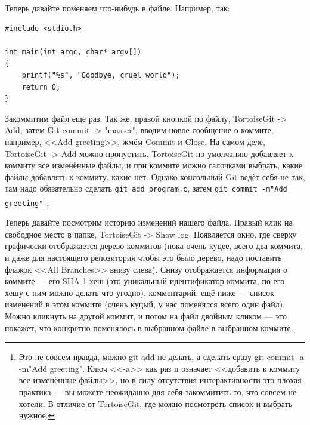 \documentclass{../text-style}
\begin{document}
Теперь давайте поменяем что-нибудь в файле. Например, так:

\begin{verbatim}
#include <stdio.h>

int main(int argc, char* argv[])
{
    printf("%s", "Goodbye, cruel world");
    return 0;
}
\end{verbatim}

Закоммитим файл ещё раз. Так же, правой кнопкой по файлу, TortoiseGit -> Add, затем Git commit -> "master", вводим новое сообщение о коммите, например, <<Add greeting>>, жмём Commit и Close. На самом деле, TortoiseGit -> Add можно пропустить, TortoiseGit по умолчанию добавляет к коммиту все изменённые файлы, и при коммите можно галочками выбрать, какие файлы добавлять к коммиту, какие нет. Однако консольный Git ведёт себя не так, там надо обязательно сделать \verb|git add program.c|, затем \verb|git commit -m"Add greeting"|\footnote{Это не совсем правда, можно git add не делать, а сделать сразу git commit -a -m"Add greeting". Ключ <<-a>> как раз и означает <<добавить к коммиту все изменённые файлы>>, но в силу отсутствия интерактивности это плохая практика --- вы можете неожиданно для себя закоммитить то, что совсем не хотели. В отличие от TortoiseGit, где можно посмотреть список и выбрать нужное.}.

Теперь давайте посмотрим историю изменений нашего файла. Правый клик на свободное место в папке, TortoiseGit -> Show log. Появляется окно, где сверху графически отображается дерево коммитов (пока очень куцее, всего два коммита, и даже для настоящего репозитория чтобы это было дерево, надо поставить флажок <<All Branches>> внизу слева). Снизу отображается информация о коммите --- его SHA-1-хеш (это уникальный идентификатор коммита, по его хешу с ним можно делать что угодно), комментарий, ещё ниже --- список изменений в этом коммите (очень куцый, у нас поменялся всего один файл). Можно кликнуть на другой коммит, и потом на файл двойным кликом --- это покажет, что конкретно поменялось в выбранном файле в выбранном коммите.
\end{document}
